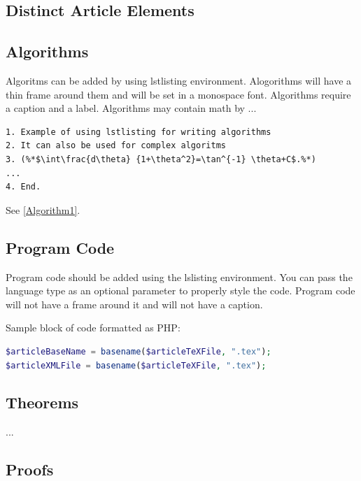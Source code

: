 \documentclass{csmagazine}
\begin{document}
\begin{flushleft}
\section{Distinct Article Elements}

\subsection{Algorithms}

Algoritms can be added by using lstlisting environment. Alogorithms will have a thin frame around them and will be set in a monospace font. Algorithms require a caption and a label. Algorithms may contain math by ...

\pagebreak

\begin{lstlisting}[caption={Add a caption for your algorithm here}, captionpos=b, label=Algorithm1, frame=single]
1. Example of using lstlisting for writing algorithms
2. It can also be used for complex algoritms
3. (%*$\int\frac{d\theta} {1+\theta^2}=\tan^{-1} \theta+C$.%*)
...
4. End. 
\end{lstlisting}

See \ref{Algorithm1}.

\subsection{Program Code}

Program code should be added using the lslisting environment. You can pass the language type as an optional parameter to properly style the code. Program code will not have a frame around it and will not have a caption.

Sample block of code formatted as PHP:

\begin{lstlisting}[language=PhP]
$articleBaseName = basename($articleTeXFile, ".tex");
$articleXMLFile = basename($articleTeXFile, ".tex");
\end{lstlisting}


\subsection{Theorems}

...

\subsection{Proofs}


\end{flushleft}
\end{document}
